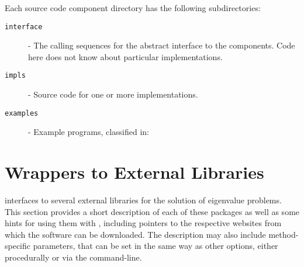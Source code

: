 Each \slepc source code component directory has the following subdirectories:
\begin{description}
\item[\texttt{interface}] - The calling sequences for the abstract interface to the components. Code here does not know about particular implementations.
\item[\texttt{impls}] - Source code for one or more implementations.
\item[\texttt{examples}] - Example programs, classified in:
\end{description}





\section{Wrappers to External Libraries}
\label{sec:wrap}

	\slepc interfaces to several external libraries for the solution of eigenvalue problems. This section provides a short description of each of these packages as well as some hints for using them with \slepc, including pointers to the respective websites from which the software can be downloaded. The description may also include method-specific parameters, that can be set in the same way as other \slepc options, either procedurally or via the command-line.

